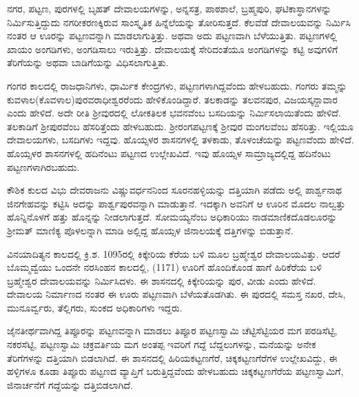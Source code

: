 ನಗರ, ಪಟ್ಟಣ, ಪುರಗಳಲ್ಲಿ ಬೃಹತ್​ ದೇವಾಲಯಗಳನ್ನು, ಅನ್ನಸತ್ರ, ಪಾಠಶಾಲೆ, ಬ್ರಹ್ಮಪುರಿ, ಘಟಿಕಾಸ್ಥಾನಗಳನ್ನು ನಿರ್ಮಿಸುತ್ತಿದ್ದುದು ನಗರೀಕರಣಕ್ಕಿರುವ ಸಾಂಸ್ಕೃತಿಕ ಹಿನ್ನೆಲೆಯನ್ನು ತೋರಿಸುತ್ತದೆ. ಕೆಲವೆಡೆ ದೇವಾಲಯವನ್ನು ನಿರ್ಮಿಸಿ ನಂತರ ಆ ಊರನ್ನು ಪಟ್ಟಣವನ್ನಾಗಿ ಮಾಡಲಾಗುತ್ತಿತ್ತು. ಅಥವಾ ಅದು ಪಟ್ಟಣವಾಗಿ ಬೆಳೆಯುತ್ತಿತು. ಪಟ್ಟಣಗಳಲ್ಲಿ ಖಾಯಂ ಅಂಗಡಿಗಳು, ಅಂಗಡಿಸಾಲು ಇರುತ್ತಿತ್ತು. ದೇವಾಲಯಕ್ಕೆ ಸೇರಿದಂತೆಯೂ ಅಂಗಡಿಗಳನ್ನು ಕಟ್ಟಿ ಅವುಗಳಿಗೆ ತೆರಿಗೆಯನ್ನು ಅಥವಾ ಬಾಡಿಗೆಯನ್ನು ವಿಧಿಸಲಾಗುತ್ತಿತು.

ಗಂಗರ ಕಾಲದಲ್ಲಿ ರಾಜಧಾನಿಗಳು, ಧಾರ್ಮಿಕ ಕೇಂದ್ರಗಳು, ಪಟ್ಟಣಗಳಾಗಿದ್ದವೆಂದು ಹೇಳಬಹುದು. ಗಂಗರು ತಮ್ಮನ್ನು ಕುವಳಾಲ(ಕೊವಳಾಲ)ಪುರವರಾಧೀಶ್ವರರೆಂದು ಹೇಳಿಕೊಂಡಿದ್ದಾರೆ. ತಲಕಾಡನ್ನು ತಲವನಪುರ, ವಿಜಯಸ್ಕನ್ದಾವಾರ ಎಂದು ಹೇಳಿದೆ. ಅದೇ ರೀತಿ ಶ‍್ರೀವುರದಲ್ಲಿ ಲೋಕತಿಲಕ ಭವನವೆಂಬ ಬಸದಿಯನ್ನು ನಿರ್ಮಿಸಲಾಯಿತೆಂದು ಹೇಳಿದೆ. ತಲಕಾಡಿಗೆ ಶ‍್ರೀಪುರವೆಂಬ ಹೆಸರಿತ್ತೆಂದು ಹೇಳಬಹುದು. ಶ‍್ರೀರಂಗಪಟ್ಟಣಕ್ಕೆ ಶ‍್ರೀವುರ ಮಂಗಲವೆಂಬ ಹೆಸರಿತ್ತು. ಇಲ್ಲಿಯೂ ದೇವಾಲಯಗಳು, ಬಸದಿಗಳು ಇದ್ದವು. ಹೊಯ್ಸಳರ ಶಾಸನಗಳಲ್ಲಿ ತಳಕಾಡು,  ತೊಳಂಚೆಯನ್ನು ಪಟ್ಟಣವೆಂದು ಹೇಳಿದೆ. ಹೊಯ್ಸಳರ ಶಾಸನಗಳಲ್ಲಿ ಹದಿನೆಂಟು ಪಟ್ಟಣದ ಉಲ್ಲೇಖವಿದೆ. ಇವು ಹೊಯ್ಸಳ ಸಾಮ್ರಾಜ್ಯದಲ್ಲಿದ್ದ ಹದಿನೆಂಟು ಪಟ್ಟಣಗಳಾಗಿರಬಹುದು.

ಕೌಶಿಕ ಕುಲದ ವಿಭು ದೇವರಾಜನು ವಿಷ್ಣುವರ್ಧನನಿಂದ ಸೂರನಹಳ್ಳಿಯನ್ನು ದತ್ತಿಯಾಗಿ ಪಡೆದು ಅಲ್ಲಿ ಪಾರ್ಶ್ವನಾಥ ಜಿನಗೇಹವನ್ನು ಕಟ್ಟಿಸಿ ಅದನ್ನು ಪಾರ್ಶ್ವಪುರವನ್ನಾಗಿ ಮಾಡುತ್ತಾನೆ. ಇದಕ್ಕಾಗಿ ಅವನಿಗೆ ಆ ಊರಿನ ಮೊದಲ ನಾಲ್ವತ್ತು ಹೊನ್ನಿನೊಳಗೆ ಹತ್ತು ಹೊನ್ನನ್ನು ನೀಡಲಾಗುತ್ತದೆ. ಸೋಮಯ್ಯನೆಂಬ ಅಧಿಕಾರಿಯು ನಾಡಮಾಣಿಕದೊಡಲೂರನ್ನು ಶ‍್ರೀಮತ್​ ಮಾಣಿಕ್ಯ ಪೊಳಲನ್ನಾಗಿ ಮಾಡಿ ಅಲ್ಲಿದ್ದ ಹೊಯ್ಸಳ ಜಿನಾಲಯಕ್ಕೆ ದತ್ತಿಗಳನ್ನು ಬಿಡುತ್ತಾನೆ.

ವಿನಯಾದಿತ್ಯನ ಕಾಲದಲ್ಲಿ ಕ್ರಿ.ಶ. 1095ರಲ್ಲಿ ಕಿಕ್ಕೇರಿಯ ಕೆರೆಯ ಬಳಿ ಮೂಲ ಬ್ರಹ್ಮೇಶ್ವರ ದೇವಾಲಯವಿತ್ತು. ಆದರೆ ಬೊಮ್ಮವ್ವೆಯು ಒಂದನೇ ನರಸಿಂಹನ ಕಾಲದಲ್ಲಿ, (1171) ಊರಿಗೆ ಹೊಂದಿಕೊಂಡ ಹಾಗೆ ಹಿರಿಕೆರೆಯ ಬಳಿ ಬ್ರಹ್ಮೇಶ್ವರ ದೇವಾಲಯವನ್ನು ನಿರ್ಮಿಸಿದಳು. ಈ ಶಾಸನದಲ್ಲಿ ಕಿಕ್ಕೇರಿಯನ್ನು ಪುರ, ವೀಡು ಎಂದು ಹೇಳಿದೆ. ದೇವಾಲಯ ನಿರ್ಮಾಣದ ನಂತರ ಈ ಊರು ಪಟ್ಟಣವಾಗಿ ಬೆಳೆಯತೊಡಗಿತು. ಈ ಪುರದಲ್ಲಿ ಸಮಸ್ತ ನಖರ, ದೇಸಿ, ಮುನೂರ್ವ್ವರು, ತೆಲ್ಲಿಗರು, ಸುಂಕದ ಅಧಿಕಾರಿಗಳು ಇದ್ದರು.

ಜೈನತೀರ್ಥವಾಗಿದ್ದ ತಿಪ್ಪೂರನ್ನು ಪಟ್ಟಣವನ್ನಾಗಿ ಮಾಡಲು ತಿಪ್ಪೂರ ಪಟ್ಟಣಸ್ವಾಮಿ ಚೆಟ್ಟಿಸೆಟ್ಟಿಯರ ಮಗ ಪರಡಿಸೆಟ್ಟಿ, ನಕರಸೆಟ್ಟಿ, ಪಟ್ಟಣಸ್ವಾಮಿ ಚಕ್ರವರ್ತಿಯ ಮಗ ಅಂತಪ್ಪ ಇವರಿಗೆ ಗದ್ದೆ ಬೆದ್ದಲುಗಳನ್ನು, ಮನೆಯನ್ನು ಅನೇಕ ತೆರಿಗೆಗಳನ್ನು ದತ್ತಿಯಾಗಿ ಬಿಡಲಾಗಿದೆ. ಈ ಶಾಸನದಲ್ಲಿ ಹಿರಿಯಕಟ್ಟಣಗೆರೆ, ಚಿಕ್ಕಕಟ್ಟಣಗೆರೆಗಳ ಉಲ್ಲೇಖವಿದ್ದು, ಈ ಹಳ್ಳಿಗಳೂ ಕೂಡಾ ತಿಪ್ಪೂರು ಪಟ್ಟಣದ ವ್ಯಾಪ್ತಿಗೆ ಬರುತ್ತಿದ್ದವೆಂದು ಹೇಳಬಹುದು ಚಿಕ್ಕಕಟ್ಟಣಗೆರೆಯ ಪಟ್ಟಣಸ್ವಾಮಿಗೆ, ಜಿನಾರ್ಚನೆಗೆ ಗದ್ದೆಯನ್ನು ದತ್ತಿಬಿಡಲಾಗಿದೆ.

